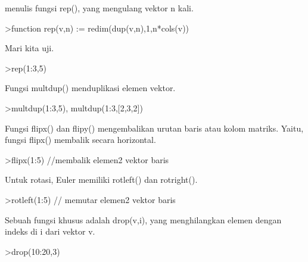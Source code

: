 \documentclass[a4paper,10pt]{article}
\begin{document}
\begin{eulernotebook}
\begin{eulercomment}
\begin{eulercomment}
\begin{eulercomment}
\begin{eulercomment}
\begin{eulercomment}
\begin{eulercomment}
\begin{eulercomment}
menulis fungsi rep(), yang mengulang vektor n kali.
\end{eulercomment}
\begin{eulerprompt}
>function rep(v,n) := redim(dup(v,n),1,n*cols(v))
\end{eulerprompt}
\begin{eulercomment}
Mari kita uji.
\end{eulercomment}
\begin{eulerprompt}
>rep(1:3,5)
\end{eulerprompt}
\begin{euleroutput}
  [1,  2,  3,  1,  2,  3,  1,  2,  3,  1,  2,  3,  1,  2,  3]
\end{euleroutput}
\begin{eulercomment}
Fungsi multdup() menduplikasi elemen vektor.
\end{eulercomment}
\begin{eulerprompt}
>multdup(1:3,5), multdup(1:3,[2,3,2])
\end{eulerprompt}
\begin{euleroutput}
  [1,  1,  1,  1,  1,  2,  2,  2,  2,  2,  3,  3,  3,  3,  3]
  [1,  1,  2,  2,  2,  3,  3]
\end{euleroutput}
\begin{eulercomment}
Fungsi flipx() dan flipy() mengembalikan urutan baris atau kolom
matriks. Yaitu, fungsi flipx() membalik secara horizontal.
\end{eulercomment}
\begin{eulerprompt}
>flipx(1:5) //membalik elemen2 vektor baris
\end{eulerprompt}
\begin{euleroutput}
  [5,  4,  3,  2,  1]
\end{euleroutput}
\begin{eulercomment}
Untuk rotasi, Euler memiliki rotleft() dan rotright().
\end{eulercomment}
\begin{eulerprompt}
>rotleft(1:5) // memutar elemen2 vektor baris
\end{eulerprompt}
\begin{euleroutput}
  [2,  3,  4,  5,  1]
\end{euleroutput}
\begin{eulercomment}
Sebuah fungsi khusus adalah drop(v,i), yang menghilangkan elemen
dengan indeks di i dari vektor v.
\end{eulercomment}
\begin{eulerprompt}
>drop(10:20,3)
\end{eulerprompt}

\end{eulercomment}
\end{eulercomment}
\end{eulercomment}
\end{eulercomment}
\end{eulercomment}
\end{eulercomment}
\end{eulernotebook}
\end{document}
